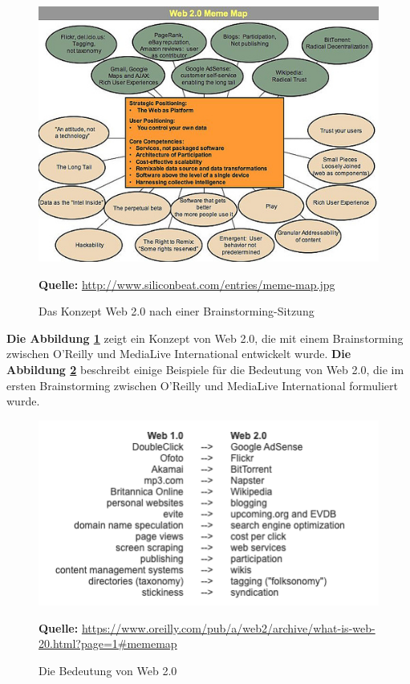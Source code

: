 \begin{figure}[H]
  \begin{center}
    \includegraphics[scale=0.6]{img/web2_map.jpg}
	\caption{Das Konzept Web 2.0 nach einer Brainstorming-Sitzung}
	\footnotesize\sffamily\textbf{Quelle:} \url{http://www.siliconbeat.com/entries/meme-map.jpg} 
	\label{fig:web2_map}
  \end{center}   
\end{figure}

\textbf{Die Abbildung \ref{fig:web2_map}} zeigt ein Konzept von Web 2.0, die mit einem Brainstorming zwischen O’Reilly und MediaLive International entwickelt wurde. \textbf{Die Abbildung \ref{fig:Web1vsWeb2}} beschreibt einige Beispiele für die Bedeutung von Web 2.0, die im ersten Brainstorming zwischen O’Reilly und MediaLive International formuliert wurde.

\begin{figure}[H]
  \begin{center}
    \includegraphics[scale=0.7]{img/web1_vs_web2}
	\caption{Die Bedeutung von Web 2.0}
	\footnotesize\sffamily\textbf{Quelle:} \url{https://www.oreilly.com/pub/a/web2/archive/what-is-web-20.html?page=1#mememap} 
	\label{fig:Web1vsWeb2}
  \end{center}   
\end{figure}

